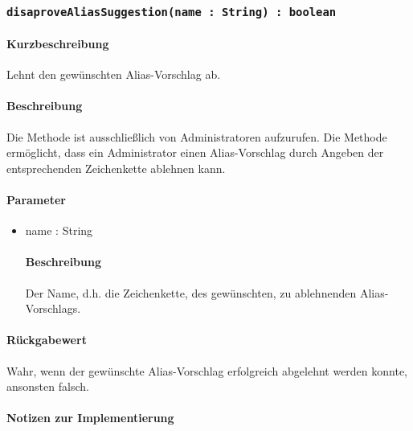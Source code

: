 \subsubsection{\texttt{disaproveAliasSuggestion(name : String) : boolean}}%
\paragraph*{Kurzbeschreibung}
Lehnt den gewünschten Alias-Vorschlag ab.
\paragraph*{Beschreibung}
Die Methode ist ausschließlich von Administratoren aufzurufen.
Die Methode ermöglicht, dass ein Administrator einen Alias-Vorschlag durch Angeben der entsprechenden Zeichenkette ablehnen kann.
\paragraph*{Parameter}
\begin{itemize}
	\item name : String
		\paragraph*{Beschreibung}
		Der Name, d.h. die Zeichenkette, des gewünschten, zu ablehnenden Alias-Vorschlags.
\end{itemize}
\paragraph*{Rückgabewert}
Wahr, wenn der gewünschte Alias-Vorschlag erfolgreich abgelehnt werden konnte, ansonsten falsch.

\paragraph*{Notizen zur Implementierung}%
